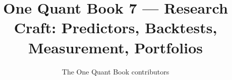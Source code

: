 \documentclass[11pt,a4paper,twoside,openany]{book}
\title{One Quant Book 7 --- Research Craft: Predictors, Backtests, Measurement, Portfolios}
\author{The One Quant Book contributors}
\date{\bookdate}
\begin{document}
\frontmatter



\tableofcontents

\mainmatter


\appendix
\part{\omsolutionspart}


\backmatter
\printindex
\end{document}
